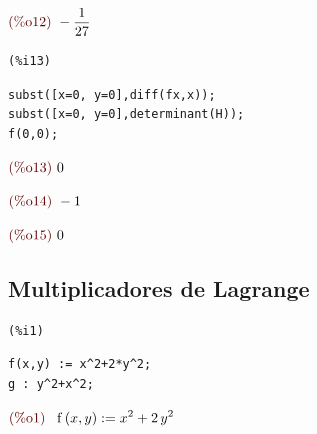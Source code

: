\documentclass[12pt]{article}
\begin{document}
\begin{math}\displaystyle
\parbox{8ex}{\color{labelcolor}(\%o12) }
-\frac{1}{27}
\end{math}


\noindent
\begin{minipage}[t]{8ex}{\color{red}\bf
\begin{verbatim}
(%i13) 
\end{verbatim}}
\end{minipage}
\begin{minipage}[t]{\textwidth}{\color{blue}
\begin{verbatim}
subst([x=0, y=0],diff(fx,x));
subst([x=0, y=0],determinant(H));
f(0,0);
\end{verbatim}}
\end{minipage}
\begin{math}\displaystyle
\parbox{8ex}{\color{labelcolor}(\%o13) }
0
\end{math}

\begin{math}\displaystyle
\parbox{8ex}{\color{labelcolor}(\%o14) }
-1
\end{math}

\begin{math}\displaystyle
\parbox{8ex}{\color{labelcolor}(\%o15) }
0
\end{math}


\subsection{Multiplicadores de Lagrange}
\noindent
\begin{minipage}[t]{8ex}{\color{red}\bf
\begin{verbatim}
(%i1) 
\end{verbatim}}
\end{minipage}
\begin{minipage}[t]{\textwidth}{\color{blue}
\begin{verbatim}
f(x,y) := x^2+2*y^2;
g : y^2+x^2;
\end{verbatim}}
\end{minipage}
\begin{math}\displaystyle
\parbox{8ex}{\color{labelcolor}(\%o1) }
\mathrm{f}\left( x,y\right) :={x}^{2}+2\,{y}^{2}
\end{math}
\end{document}
